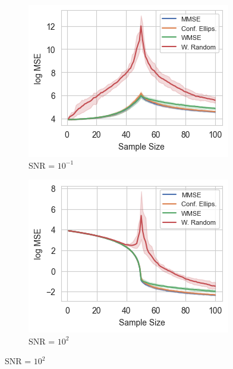 \begin{figure}%
    \centering
    \begin{subfigure}{0.3\columnwidth}
    \includegraphics[width=\columnwidth]{figures/proj1/plots/LS_MSE/SBM_500_bandwidth_50_SNRdbs_-10.0_samps_100_MSE_LS.png}
    \caption{SNR = $10^{-1}$}
    \label{SBM_MSE_subfiga}
    \end{subfigure}\hfill
    \begin{subfigure}{0.3\columnwidth}
    \includegraphics[width=\columnwidth]{figures/proj1/plots/LS_MSE/SBM_500_bandwidth_50_SNRdbs_20.0_samps_100_MSE_LS.png}%
    \caption{SNR = $10^{2}$}%
    \label{SBM_MSE_subfigb}%
    \end{subfigure}\hfill%

\end{figure}
